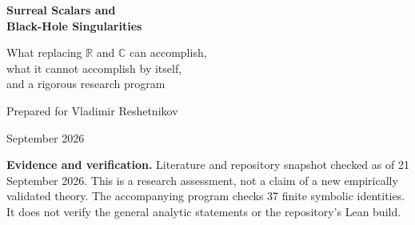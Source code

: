 \documentclass[11pt,letterpaper]{article}
\newcommand{\R}{\mathbb{R}}
\newcommand{\C}{\mathbb{C}}
\theoremstyle{definition}
\theoremstyle{remark}
\begin{document}
\begin{titlepage}
\vspace*{0.5in}
\vspace{0.45in}
\begin{flushleft}
{\LARGE\bfseries Surreal Scalars and\\[6pt] Black-Hole Singularities}\par
\vspace{0.24in}
{\Large What replacing $\R$ and $\C$ can accomplish,\\[3pt]
what it cannot accomplish by itself,\\[3pt]
and a rigorous research program}
\end{flushleft}
\vspace{0.35in}
\noindent Prepared for Vladimir Reshetnikov\par
{} September 2026
\vspace{0.35in}
\begin{abstract}
The surreal field contains genuine infinite and infinitesimal numbers, and its
complexification is algebraically closed. These properties make it attractive
for describing the extreme hierarchies occurring near gravitational
singularities. They do not, however, turn a singular spacetime into a regular
one. We separate scalar extension, asymptotic representation, geometric
extension, and physical singularity resolution. Explicit Schwarzschild
calculations show how surreal evaluation retains invariant curvature blow-up,
finite-proper-time termination, and tidal deformation. A two-scale analysis of
radial versus nonradial infall illustrates a constructive use of ordered
asymptotic fields. We also prove a regular-reduction result for formal Einstein
equations, examine a nonsingular-core metric, and distinguish finite-dimensional
surcomplex quantum algebra from the analytic structures required for quantum
field theory. The assessment incorporates established surreal integration and
transseries results and the supplied repository's actual scope. The strongest
near-term role is a carefully specified asymptotic coefficient language over
ordinary spacetime, not an unqualified replacement of the continuum or a
stand-alone theory of quantum gravity.
\end{abstract}
\vfill
\noindent\small\textbf{Evidence and verification.} Literature and repository snapshot checked
as of 21 September 2026. This is a research assessment, not a claim of a new
empirically validated theory. The accompanying program checks 37 finite
symbolic identities. It does not verify the general analytic statements or the
repository's Lean build.
\end{titlepage}
\end{document}
